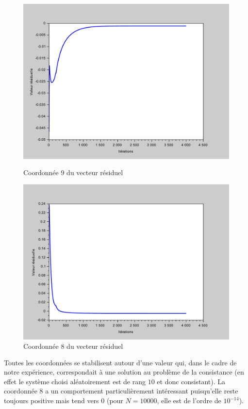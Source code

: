 \documentclass[10pt,a4paper]{article}
\begin{document}
\begin{figure}[H]
\centering
\begin{minipage}{.47\linewidth}
\centering
\includegraphics[scale=0.4]{gradprojres_9.pdf}
\caption{Coordonnée $9$ du vecteur résiduel}
\end{minipage}
\begin{minipage}{.47\linewidth}
\centering
\includegraphics[scale=0.4]{gradprojres_8.pdf}
\caption{Coordonnée $8$ du vecteur résiduel}
\end{minipage}
\end{figure}

Toutes les coordonnées se stabilisent autour d'une valeur qui, dans le cadre de notre expérience, correspondait à une solution au problème de la consistance (en effet le système choisi aléatoirement est de rang $10$ et donc consistant). La coordonnée $8$ a un comportement particulièrement intéressant puisqu'elle reste toujours positive mais tend vers $0$ (pour $N = 10000$, elle est de l'ordre de $10^{-14}$).


\end{document}

